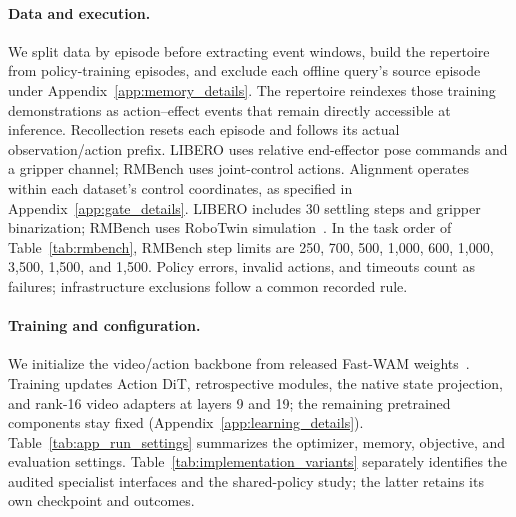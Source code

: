 \paragraph{Data and execution.}
We split data by episode before extracting event windows, build the repertoire from policy-training episodes, and exclude each offline query's source episode under Appendix~\ref{app:memory_details}.
The repertoire reindexes those training demonstrations as action--effect events that remain directly accessible at inference.
Recollection resets each episode and follows its actual observation/action prefix.
LIBERO uses relative end-effector pose commands and a gripper channel; RMBench uses joint-control actions. Alignment operates within each dataset's control coordinates, as specified in Appendix~\ref{app:gate_details}.
LIBERO includes 30 settling steps and gripper binarization; RMBench uses RoboTwin simulation~\citep{chen2025robotwin2}.
In the task order of Table~\ref{tab:rmbench}, RMBench step limits are 250, 700, 500, 1,000, 600, 1,000, 3,500, 1,500, and 1,500.
Policy errors, invalid actions, and timeouts count as failures; infrastructure exclusions follow a common recorded rule.

\paragraph{Training and configuration.}
\label{app:run_configuration}
We initialize the video/action backbone from released Fast-WAM weights~\citep{yuan2026fastwam}.
Training updates Action DiT, retrospective modules, the native state projection, and rank-16 video adapters at layers 9 and 19; the remaining pretrained components stay fixed (Appendix~\ref{app:learning_details}).
Table~\ref{tab:app_run_settings} summarizes the optimizer, memory, objective, and evaluation settings. Table~\ref{tab:implementation_variants} separately identifies the audited specialist interfaces and the shared-policy study; the latter retains its own checkpoint and outcomes.

